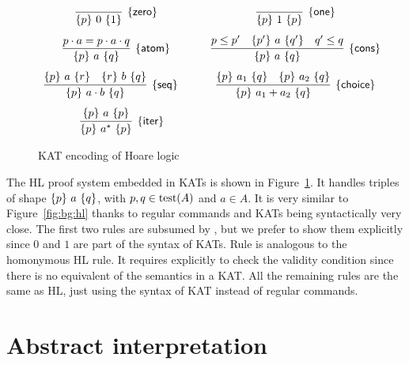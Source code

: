 \begin{figure}[t]
	\centering
	\begin{framed}
		\(
		\begin{array}{cc}
			\infer[\hlrule{zero}]
			{\hltriple{p}{0}{1}}
			{}
			\quad                 &
			\infer[\hlrule{one}]
			{\hltriple{p}{1}{p}}
			{}
			\\[7.5pt]
			\infer[\hlrule{atom}]
			{\hltriple{p}{a}{q}}
			{p \cdot a = p \cdot a \cdot q}
			\quad                 &
			\infer[\hlrule{cons}]
			{\hltriple{p}{a}{q}}
			{p \leq p'            & \hltriple{p'}{a}{q'}  & q' \leq q}
			\\[7.5pt]
			\infer[\hlrule{seq}]
			{\hltriple{p}{a \cdot b}{q}}
			{\hltriple{p}{a}{r}   & \hltriple{r}{b}{q}}
			\qquad                &
			\infer[\hlrule{choice}]
			{\hltriple{p}{a_1 + a_2}{q}}
			{\hltriple{p}{a_1}{q} & \hltriple{p}{a_2}{q}}
			\\[7.5pt]
			\infer[\hlrule{iter}]
			{\hltriple{p}{a^\kstar}{p}}
			{\hltriple{p}{a}{p}}
		\end{array}
		\)
	\end{framed}
	\vspace{-1ex}
	\caption{KAT encoding of Hoare logic}\label{fig:bg:hl-kat}
\end{figure}
The HL proof system embedded in KATs is shown in Figure~\ref{fig:bg:hl-kat}. It handles triples of shape $\{p\}~a~\{q\}$, with $p, q \in \text{test}(A)$ and $a \in A$. It is very similar to Figure~\ref{fig:bg:hl} thanks to regular commands and KATs being syntactically very close. The first two rules are subsumed by , but we prefer to show them explicitly since $0$ and $1$ are part of the syntax of KATs. Rule  is analogous to the homonymous HL rule. It requires explicitly to check the validity condition since there is no equivalent of the semantics in a KAT. All the remaining rules are the same as HL, just using the syntax of KAT instead of regular commands.

\section{Abstract interpretation}\label{sec:bg:absint}
